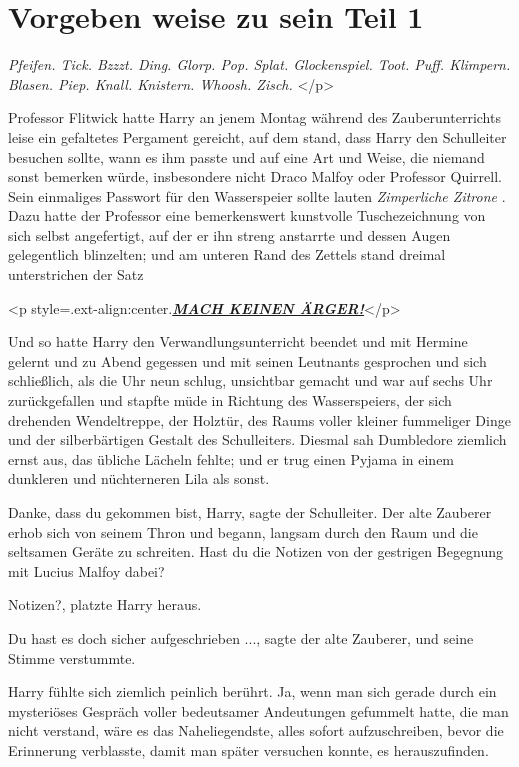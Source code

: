 \chapter{Vorgeben weise zu sein Teil 1}

\emph{Pfeifen. Tick. Bzzzt. Ding. Glorp. Pop. Splat. Glockenspiel. Toot. Puff.
Klimpern. Blasen. Piep. Knall. Knistern. Whoosh. Zisch. }</p>

Professor Flitwick hatte Harry an jenem Montag während des Zauberunterrichts
leise ein gefaltetes Pergament gereicht, auf dem stand, dass Harry den
Schulleiter besuchen sollte, wann es ihm passte und auf eine Art und Weise, die
niemand sonst bemerken würde, insbesondere nicht Draco Malfoy oder Professor
Quirrell. Sein einmaliges Passwort für den Wasserspeier sollte lauten
\emph{\glqq Zimperliche Zitrone\grqq{} }. Dazu hatte der Professor eine
bemerkenswert kunstvolle Tuschezeichnung von sich selbst angefertigt, auf der er
ihn streng anstarrte und dessen Augen gelegentlich blinzelten; und am unteren
Rand des Zettels stand dreimal unterstrichen der Satz

<p style=\grqq{}.ext-align:center\grqq{}.\textbf{\emph{\underline{MACH KEINEN
ÄRGER!}}}</p>

Und so hatte Harry den Verwandlungsunterricht beendet und mit Hermine gelernt
und zu Abend gegessen und mit seinen Leutnants gesprochen und sich schließlich,
als die Uhr neun schlug, unsichtbar gemacht und war auf sechs Uhr zurückgefallen
und stapfte müde in Richtung des Wasserspeiers, der sich drehenden Wendeltreppe,
der Holztür, des Raums voller kleiner fummeliger Dinge und der silberbärtigen
Gestalt des Schulleiters. Diesmal sah Dumbledore ziemlich ernst aus, das übliche
Lächeln fehlte; und er trug einen Pyjama in einem dunkleren und nüchterneren
Lila als sonst.

\glqq Danke, dass du gekommen bist, Harry\grqq{}, sagte der Schulleiter. Der
alte Zauberer erhob sich von seinem Thron und begann, langsam durch den Raum und
die seltsamen Geräte zu schreiten. \glqq Hast du die Notizen von der gestrigen
Begegnung mit Lucius Malfoy dabei?\grqq{}

\glqq Notizen?\grqq{}, platzte Harry heraus.

\glqq Du hast es doch sicher aufgeschrieben ...\grqq{}, sagte der alte Zauberer,
und seine Stimme verstummte.

Harry fühlte sich ziemlich peinlich berührt. Ja, wenn man sich gerade durch ein
mysteriöses Gespräch voller bedeutsamer Andeutungen gefummelt hatte, die man
nicht verstand, wäre es das Naheliegendste, alles sofort aufzuschreiben, bevor
die Erinnerung verblasste, damit man später versuchen konnte, es herauszufinden.

